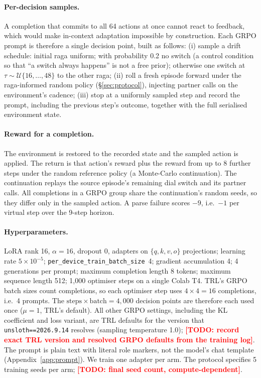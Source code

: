 \documentclass[11pt]{article}
\newcommand{\todo}[1]{\textcolor{red}{\textbf{[TODO: #1]}}}
\begin{document}
\paragraph{Per-decision samples.} A completion that commits to all 64 actions at once cannot react to feedback, which would make in-context adaptation impossible by construction. Each GRPO prompt is therefore a single decision point, built as follows:
(i) sample a drift schedule: initial raga uniform; with probability 0.2 no switch (a control condition so that ``a switch always happens'' is not a free prior); otherwise one switch at $\tau \sim \mathcal{U}\{16,\dots,48\}$ to the other raga;
(ii) roll a fresh episode forward under the raga-informed random policy (\S\ref{sec:protocol}), injecting partner calls on the environment's cadence;
(iii) stop at a uniformly sampled step and record the prompt, including the previous step's outcome, together with the full serialised environment state.

\paragraph{Reward for a completion.} The environment is restored to the recorded state and the sampled action is applied. The return is that action's reward plus the reward from up to 8 further steps under the random reference policy (a Monte-Carlo continuation). The continuation replays the source episode's remaining dial switch and its partner calls. All completions in a GRPO group share the continuation's random seeds, so they differ only in the sampled action. A parse failure scores $-9$, i.e.\ $-1$ per virtual step over the 9-step horizon.

\paragraph{Hyperparameters.} LoRA rank 16, $\alpha=16$, dropout 0, adapters on $\{q,k,v,o\}$ projections; learning rate $5\times10^{-5}$; \texttt{per\_device\_train\_batch\_size}~4; gradient accumulation 4; 4 generations per prompt; maximum completion length 8 tokens; maximum sequence length 512; 1{,}000 optimiser steps on a single Colab T4. TRL's GRPO batch sizes count completions, so each optimiser step uses $4\times4=16$ completions, i.e.\ 4 prompts. The $\text{steps}\times\text{batch} = 4{,}000$ decision points are therefore each used once ($\mu=1$, TRL's default). All other GRPO settings, including the KL coefficient and loss variant, are TRL defaults for the version that \texttt{unsloth==2026.9.14} resolves (sampling temperature 1.0); \todo{record exact TRL version and resolved GRPO defaults from the training log}. The prompt is plain text with literal role markers, not the model's chat template (Appendix~\ref{app:prompt}). We train one adapter per arm. The protocol specifies 5 training seeds per arm; \todo{final seed count, compute-dependent}.
\end{document}
